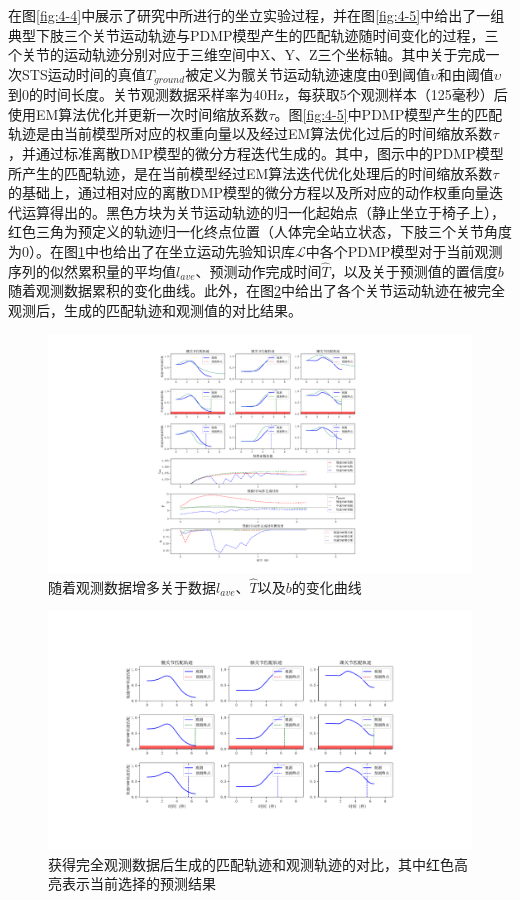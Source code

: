 在图\ref{fig:4-4}中展示了研究中所进行的坐立实验过程，并在图\ref{fig:4-5}中给出了一组典型下肢三个关节运动轨迹与PDMP模型产生的匹配轨迹随时间变化的过程，三个关节的运动轨迹分别对应于三维空间中X、Y、Z三个坐标轴。其中关于完成一次STS运动时间的真值$T_{ground}$被定义为髋关节运动轨迹速度由0到阈值$\upsilon $和由阈值$\upsilon$到0的时间长度。关节观测数据采样率为40Hz，每获取5个观测样本（125毫秒）后使用EM算法优化并更新一次时间缩放系数$\tau$。图\ref{fig:4-5}中PDMP模型产生的匹配轨迹是由当前模型所对应的权重向量以及经过EM算法优化过后的时间缩放系数$\tau$，并通过标准离散DMP模型的微分方程迭代生成的。其中，图示中的PDMP模型所产生的匹配轨迹，是在当前模型经过EM算法迭代优化处理后的时间缩放系数$\tau$的基础上，通过相对应的离散DMP模型的微分方程以及所对应的动作权重向量迭代运算得出的。黑色方块为关节运动轨迹的归一化起始点（静止坐立于椅子上），红色三角为预定义的轨迹归一化终点位置（人体完全站立状态，下肢三个关节角度为0）。在图\ref{fig:4-6}中也给出了在坐立运动先验知识库$\mathscr{L}$中各个PDMP模型对于当前观测序列的似然累积量的平均值$l_{ave}$、预测动作完成时间$\hat T$，以及关于预测值的置信度$b$随着观测数据累积的变化曲线。此外，在图\ref{fig:4-7}中给出了各个关节运动轨迹在被完全观测后，生成的匹配轨迹和观测值的对比结果。
\begin{figure}[htb]
    \centering\includegraphics[width=1\textwidth]{figures/4-Fig-6.pdf}
    \caption{随着观测数据增多关于数据$l_{ave}$、$\hat T$以及$b$的变化曲线}
    \label{fig:4-6}
\end{figure}

\begin{figure}[htb]
    \centering\includegraphics[width=1\textwidth]{figures/4-Fig-7.pdf}
    \caption{获得完全观测数据后生成的匹配轨迹和观测轨迹的对比，其中红色高亮表示当前选择的预测结果}
    \label{fig:4-7}
\end{figure}

